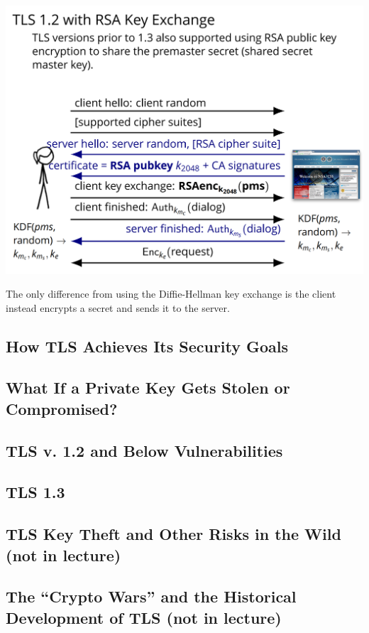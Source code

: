 \documentclass[11pt]{article} %
\begin{document}
{\includegraphics[scale=.6]{./TLS_RSA.png}

The only difference from using the Diffie-Hellman key exchange is the client 
instead encrypts a secret and sends it to the server.

\newpage
\subsection{How TLS Achieves Its Security Goals}

\subsection{What If a Private Key Gets Stolen or Compromised?}

\subsection{TLS v. 1.2 and Below Vulnerabilities}

\subsection{TLS 1.3}

\subsection{TLS Key Theft and Other Risks in the Wild (not in lecture)}

\subsection{The “Crypto Wars” and the Historical Development of TLS (not in 
lecture)}

}
\end{document}
